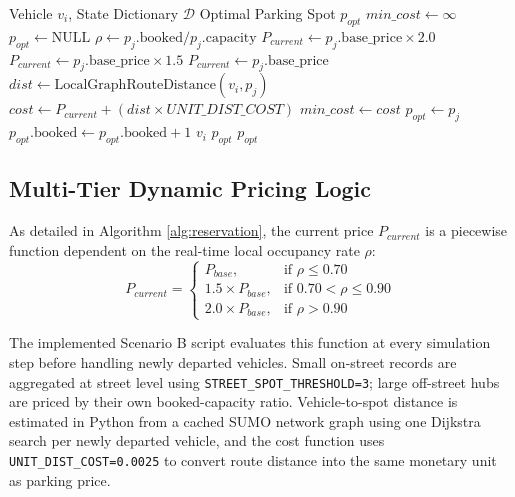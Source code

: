 \documentclass[conference]{IEEEtran}
\begin{document}
\begin{algorithm}[htbp]
    \caption{Dynamic Pricing \& Reservation Engine}
    \label{alg:reservation}
    \begin{algorithmic}[1]
        \REQUIRE Vehicle $v_i$, State Dictionary $\mathcal{D}$
        \ENSURE Optimal Parking Spot $p_{opt}$
        \STATE $min\_cost \gets \infty$
        \STATE $p_{opt} \gets \text{NULL}$
        \STATE $\rho \gets p_j.\text{booked} / p_j.\text{capacity}$
        \STATE $P_{current} \gets p_j.\text{base\_price} \times 2.0$
        \STATE $P_{current} \gets p_j.\text{base\_price} \times 1.5$
        \ELSE
        \STATE $P_{current} \gets p_j.\text{base\_price}$
        \ENDIF
        \STATE $dist \gets \text{LocalGraphRouteDistance}(v_i, p_j)$
        \STATE $cost \gets P_{current} + (dist \times UNIT\_DIST\_COST)$
        \STATE $min\_cost \gets cost$
        \STATE $p_{opt} \gets p_j$
        \ENDIF
        \ENDIF
        \ENDFOR
        \STATE $p_{opt}.\text{booked} \gets p_{opt}.\text{booked} + 1$
        \STATE {} $v_i$  $p_{opt}$ 
        \ENDIF
        \RETURN $p_{opt}$
    \end{algorithmic}
\end{algorithm}

\subsection{Multi-Tier Dynamic Pricing Logic}
As detailed in Algorithm \ref{alg:reservation}, the current price $P_{current}$ is a piecewise function dependent on the real-time local occupancy rate $\rho$:
\begin{equation}
    P_{current} =
    \begin{cases}
        P_{base},            & \text{if } \rho \le 0.70        \\
        1.5 \times P_{base}, & \text{if } 0.70 < \rho \le 0.90 \\
        2.0 \times P_{base}, & \text{if } \rho > 0.90
    \end{cases}
\end{equation}

The implemented Scenario B script evaluates this function at every simulation step before handling newly departed vehicles. Small on-street records are aggregated at street level using \texttt{STREET\_SPOT\_THRESHOLD=3}; large off-street hubs are priced by their own booked-capacity ratio. Vehicle-to-spot distance is estimated in Python from a cached SUMO network graph using one Dijkstra search per newly departed vehicle, and the cost function uses \texttt{UNIT\_DIST\_COST=0.0025} to convert route distance into the same monetary unit as parking price.
\end{document}
